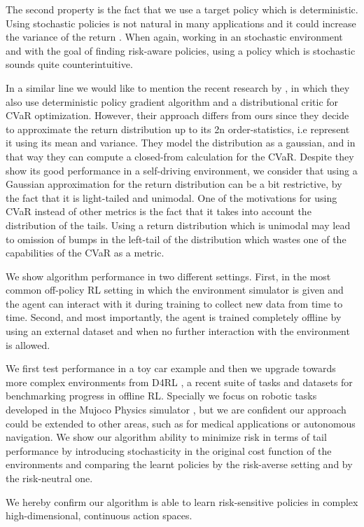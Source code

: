 The second property is the fact that we use a target policy which is deterministic.
Using stochastic policies is not natural in many applications and it
could increase the variance of the return \citet{Taleghan2018}.
When again, working in an stochastic 
environment and with the goal of finding risk-aware policies, using a policy which is stochastic 
sounds quite counterintuitive.

In a similar line we would like to mention the recent research by \citet{tang2020}, in
which they also use deterministic policy gradient algorithm and a distributional critic for
CVaR optimization. However, their approach differs from ours since they decide to
approximate the return distribution up to its 2n order-statistics,
i.e represent it using its mean and variance. They model the distribution as a gaussian, and in
that way they can compute a closed-from calculation for the CVaR.
Despite they show its good performance in a self-driving environment, we consider
that using a Gaussian approximation for the return distribution can be a bit restrictive, by the fact that it is light-tailed and
unimodal. One of the motivations for using CVaR instead of other metrics is the fact that it takes into account
the distribution of the tails. Using a  return distribution which is unimodal may lead to omission of
bumps in the left-tail of the distribution which wastes one of the capabilities of the CVaR as a metric.


We show algorithm performance in two different settings.
First, in the most common off-policy RL setting in which the environment simulator is given and
the agent can interact with it during training to collect new data from time to time.
Second, and most importantly, the agent is trained completely offline by using an external
dataset and when no further interaction with the environment is allowed.

We first test performance in a toy car example and then we upgrade towards more complex environments
from D4RL \citep{d4rl}, a recent suite of tasks and datasets for benchmarking progress in offline RL.
Specially we focus on robotic tasks developed in the Mujoco Physics simulator \citep{Todorov2012},
but we are confident our approach could be extended to other areas, such as 
for medical applications or autonomous navigation.
We show our algorithm ability to minimize risk in terms of 
tail performance by introducing
stochasticity in the original cost function of the environments and comparing the learnt policies
by the risk-averse setting and by the risk-neutral one.

We hereby confirm our algorithm is able to learn risk-sensitive policies in
complex high-dimensional, continuous action spaces.

